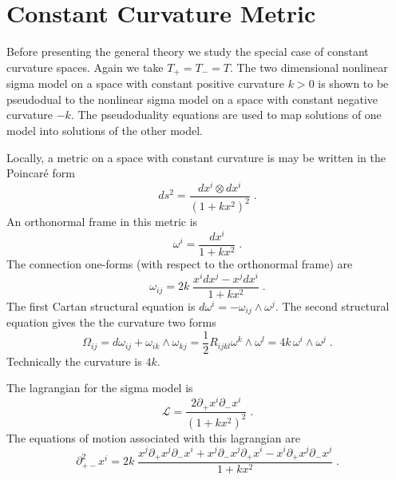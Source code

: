 \documentclass[a4paper,12pt]{article}
\newcommand{\dalem}{\partial^{2}_{+-}}
\newcommand{\dminus}{\partial_{-}}
\newcommand{\dplus}{\partial_{+}}
\newcommand{\half}{\frac{1}{2}}
\begin{document}
\section{Constant Curvature Metric}
\label{sec:constant}

Before presenting the general theory we study the special case of
constant curvature spaces.  Again we take $T_{+}=T_{-}=T$. 
The two dimensional nonlinear sigma model on a space with constant
positive curvature $k>0$ is shown to be pseudodual to the nonlinear
sigma model on a space with constant negative curvature $-k$. 
The pseudoduality equations are used to map solutions of one model into
solutions of the other model.

Locally, a metric on a space with constant curvature is may be written 
in the Poincar\'{e} form
\begin{equation}
    ds^{2} = \frac{dx^{i}\otimes dx^{i}}{\left(1 + k x^{2}\right)^{2}}\;.
    \label{eq:constcurv}
\end{equation}
An orthonormal frame in this metric is
\begin{equation}
    \omega^{i} = \frac{dx^{i}}{1 + kx^{2}}\;.
    \label{eq:frame}
\end{equation}
The connection one-forms (with respect to the orthonormal frame) are
\begin{equation}
    \omega_{ij} = 2k\; \frac{x^{i}dx^{j}-x^{j}dx^{i}}{1+kx^{2}}\;.
    \label{eq:connection}
\end{equation}
The first Cartan structural equation is $d\omega^{i}= 
-\omega_{ij}\wedge\omega^{j}$. The second structural equation gives the
the curvature two forms
\begin{equation}
    \Omega_{ij} = d\omega_{ij} + \omega_{ik}\wedge\omega_{kj} 
    =\half R_{ijkl}\omega^{k}\wedge\omega^{l} = 
    4k\,\omega^{i}\wedge\omega^{j}\;.
    \label{eq:curvature}
\end{equation}
Technically the curvature is $4k$.

The lagrangian for the sigma model is
\begin{equation}
    \mathcal{L} = 
    \frac{2\dplus x^{i} \dminus x^{i}}{\left(1 + k x^{2}\right)^{2}}\;.
    \label{eq:lagrangian}
\end{equation}
The equations of motion associated with this lagrangian are
\begin{equation}
    \dalem x^{i} = 2k\;
    \frac{x^{j}\dplus x^{j}\dminus x^{i}
    	+ x^{j}\dminus x^{j} \dplus x^{i}
	- x^{i}\dplus x^{j} \dminus x^{j}}{1 + kx^{2}}\;.
    \label{eq:eom}
\end{equation}
\end{document}
